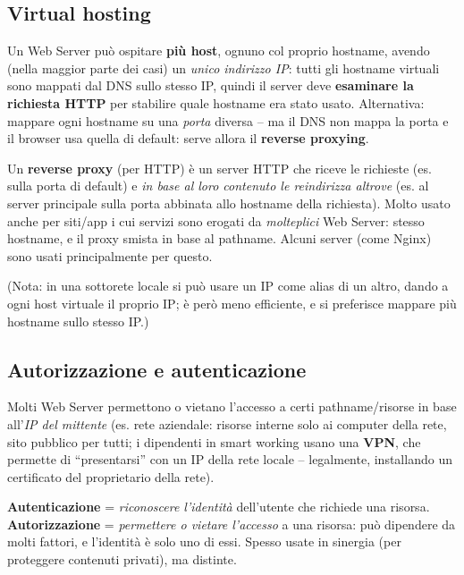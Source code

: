 \subsection{Virtual hosting}
Un Web Server pu\`o ospitare \textbf{pi\`u host}, ognuno col proprio hostname, avendo (nella
maggior parte dei casi) un \emph{unico indirizzo IP}: tutti gli hostname virtuali sono
mappati dal DNS sullo stesso IP, quindi il server deve \textbf{esaminare la richiesta HTTP}
per stabilire quale hostname era stato usato. Alternativa: mappare ogni hostname su una
\emph{porta} diversa -- ma il DNS non mappa la porta e il browser usa quella di default:
serve allora il \textbf{reverse proxying}.
\begin{definizione}
Un \textbf{reverse proxy} (per HTTP) \`e un server HTTP che riceve le richieste (es. sulla
porta di default) e \emph{in base al loro contenuto le reindirizza altrove} (es. al server
principale sulla porta abbinata allo hostname della richiesta). Molto usato anche per
siti/app i cui servizi sono erogati da \emph{molteplici} Web Server: stesso hostname, e il
proxy smista in base al pathname. Alcuni server (come Nginx) sono usati principalmente per
questo.
\end{definizione}
(Nota: in una sottorete locale si pu\`o usare un IP come alias di un altro, dando a ogni host
virtuale il proprio IP; \`e per\`o meno efficiente, e si preferisce mappare pi\`u hostname
sullo stesso IP.)

\subsection{Autorizzazione e autenticazione}
Molti Web Server permettono o vietano l'accesso a certi pathname/risorse in base
all'\emph{IP del mittente} (es. rete aziendale: risorse interne solo ai computer della rete,
sito pubblico per tutti; i dipendenti in smart working usano una \textbf{VPN}, che permette
di ``presentarsi'' con un IP della rete locale -- legalmente, installando un certificato del
proprietario della rete).
\begin{attenzione}
\textbf{Autenticazione} = \emph{riconoscere l'identit\`a} dell'utente che richiede una
risorsa. \textbf{Autorizzazione} = \emph{permettere o vietare l'accesso} a una risorsa: pu\`o
dipendere da molti fattori, e l'identit\`a \`e solo uno di essi. Spesso usate in sinergia
(per proteggere contenuti privati), ma distinte.
\end{attenzione}

